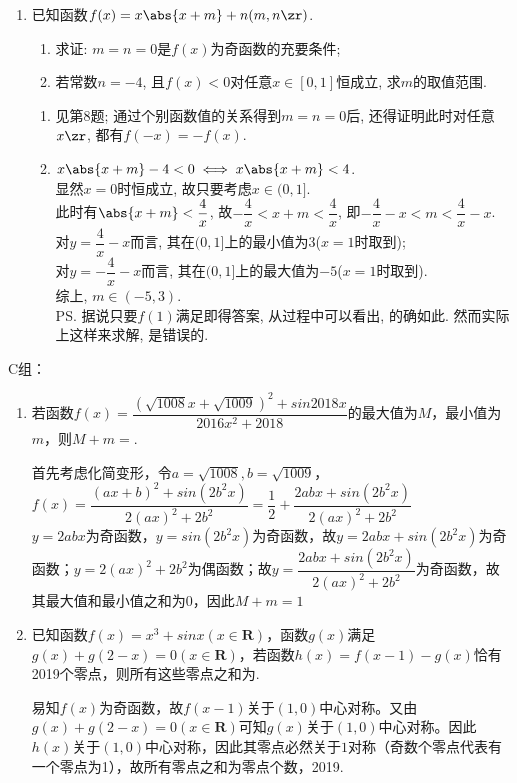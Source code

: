 \begin{enumerate}
\item 已知函数$f(x)=x\abs{x+m}+n(m,n\zr)$. 
\begin{enumerate}
\item 求证: $m=n=0$是$f(x)$为奇函数的充要条件; 
\item 若常数$n=-4$, 且$f(x)<0$对任意$x\in[0,1]$恒成立, 求$m$的取值范围. 
\end{enumerate}
\begin{jieda}
\begin{enumerate}
\item 见第8题; 通过个别函数值的关系得到$m=n=0$后, 还得证明此时对任意$x\zr$, 都有$f(-x)=-f(x)$. 
\item $x\abs{x+m}-4<0\iff x\abs{x+m}<4$. \\
显然$x=0$时恒成立, 故只要考虑$x\in(0,1]$. \\
此时有$\abs{x+m}<\dfrac{4}{x}$, 故$-\dfrac{4}{x}<x+m<\dfrac{4}{x}$, 即$-\dfrac{4}{x}-x<m<\dfrac{4}{x}-x$. \\
对$y=\dfrac{4}{x}-x$而言, 其在$(0,1]$上的最小值为$3$($x=1$时取到); \\
对$y=-\dfrac{4}{x}-x$而言, 其在$(0,1]$上的最大值为$-5$($x=1$时取到). \\
综上, $m\in(-5,3)$. \\
\ps 据说只要$f(1)$满足即得答案, 从过程中可以看出, 的确如此. 然而实际上这样来求解, 是错误的. %
\end{enumerate}
\end{jieda}
\begin{vspace_}
\vsp[5]
\end{vspace_}
\end{enumerate}

C组：
\begin{enumerate}
    \item 若函数$f(x) = \dfrac{(\sqrt{1008}x + \sqrt{1009})^2 + sin2018x}{2016x^2+2018}$的最大值为$M$，最小值为$m$，则$M + m = $.
    \begin{jieda}
    首先考虑化简变形，令$a = \sqrt{1008}, b = \sqrt{1009}$，\\
    $f(x) = \dfrac{(ax+b)^2 + sin(2b^2x)}{2(ax)^2+2b^2} = \dfrac{1}{2} + \dfrac{2abx + sin(2b^2x)}{2(ax)^2+2b^2}$ \\
    $y = 2abx$为奇函数，$y = sin(2b^2x)$为奇函数，故$y = 2abx + sin(2b^2x)$为奇函数；$y = 2(ax)^2+2b^2$为偶函数；故$y = \dfrac{2abx + sin(2b^2x)}{2(ax)^2+2b^2}$为奇函数，故其最大值和最小值之和为0，因此$M + m = 1$
    \end{jieda}
    \item 已知函数$f(x) = x^3 + sinx (x \in \mathbf{R})$，函数$g(x)$满足$g(x)+g(2-x) = 0(x \in \mathbf{R})$，若函数$h(x) = f(x-1)-g(x)$恰有2019个零点，则所有这些零点之和为.
    \begin{jieda}
    易知$f(x)$为奇函数，故$f(x-1)$关于$(1, 0)$中心对称。又由$g(x)+g(2-x) = 0(x \in \mathbf{R})$可知$g(x)$关于$(1, 0)$中心对称。因此$h(x)$关于$(1, 0)$中心对称，因此其零点必然关于$1$对称（奇数个零点代表有一个零点为1），故所有零点之和为零点个数，2019.
    \end{jieda}
\end{enumerate}


